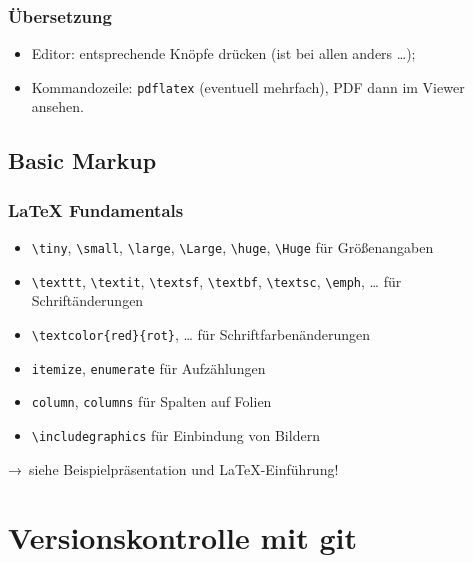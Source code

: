 \documentclass{cms-kurs}
\begin{document}
\begin{frame}
  \frametitle{Übersetzung}

  \onslide<+->

  \begin{itemize}
  \item<+-> Editor: entsprechende Knöpfe drücken (ist bei allen anders …);
  \item<+-> Kommandozeile: \lstinline{pdflatex} (eventuell mehrfach), PDF dann
    im Viewer ansehen.
  \end{itemize}

\end{frame}

\subsection{Basic Markup}

\begin{frame}[fragile]
  \frametitle{\LaTeX{} Fundamentals}

  \onslide<+->

  \begin{itemize}
  \item \lstinline{\tiny}, \lstinline{\small}, \lstinline{\large},
    \lstinline{\Large}, \lstinline{\huge}, \lstinline{\Huge} für Größenangaben
  \item \lstinline{\texttt}, \lstinline{\textit}, \lstinline{\textsf},
    \lstinline{\textbf}, \lstinline{\textsc}, \lstinline{\emph}, … für
    Schriftänderungen
  \item \lstinline=\textcolor{red}{rot}=, … für Schriftfarbenänderungen
  \item \lstinline{itemize}, \lstinline{enumerate} für Aufzählungen
  \item \lstinline{column}, \lstinline{columns} für Spalten auf Folien
  \item \lstinline{\includegraphics} für Einbindung von Bildern
  \end{itemize}

  \onslide<+->

  \medskip{}

  → siehe Beispielpräsentation und \LaTeX-Einführung!

\end{frame}

\section{Versionskontrolle mit git}
\end{document}
